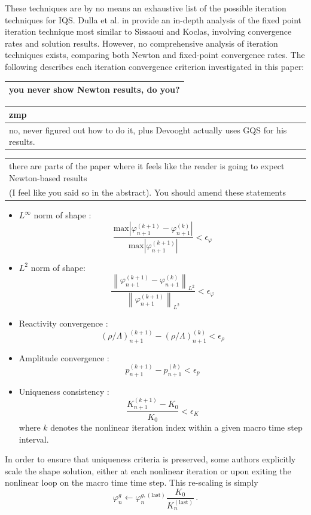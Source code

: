 \documentclass{elsarticle}
\def\answer#1#2{{\color{blue}
     \begin{tabular}{|l|}
       \hline{ #1}\\\hline{ #2}\\\hline
     \end{tabular}}}
\def\comm#1{{\color{magenta}
     \begin{tabular}{|l|}
       \hline #1 \\\hline
     \end{tabular}}}
\newcommand{\be}{\begin{equation}}
\newcommand{\ee}{\end{equation}}
\newcommand{\norm}[1]{\left\lVert#1\right\rVert_{L^2}}
\begin{document}
These techniques are by no means an exhaustive list of the possible iteration techniques for IQS. Dulla et al. in \cite{Dulla2008} provide an 
in-depth analysis of the fixed point iteration technique most similar to Sissaoui and Koclas, involving convergence rates and solution results.  
However, no comprehensive analysis of iteration techniques exists, comparing both Newton and fixed-point convergence rates.  The following describes 
each iteration convergence criterion investigated in this paper:
\comm{you never show Newton results, do you?}

\answer{zmp}{no, never figured out how to do it, plus Devooght actually uses GQS for his results.}

\comm{there are parts of the paper where it feels like the reader is going to expect Newton-based results\\
(I feel like you said so in the abstract). You should amend these statements}

\begin{itemize}
\item $L^\infty$ norm of shape \cite{Monier_diss}: 
\[
\frac{\text{max}\left|\varphi_{n+1}^{(k+1)} - \varphi_{n+1}^{(k)}\right|}{\text{max}\left|\varphi_{n+1}^{(k+1)}\right|} < \epsilon_{\varphi}
\]
\item $L^2$ norm of shape: 
\[
\frac{\norm{\varphi_{n+1}^{(k+1)} - \varphi_{n+1}^{(k)}}}{\norm{\varphi_{n+1}^{(k+1)}}} < \epsilon_{\varphi}
\]
\item Reactivity convergence \cite{Monier_diss}: 
\[
\left(\rho/\Lambda\right)^{(k+1)}_{n+1} - \left(\rho/\Lambda\right)^{(k)}_{n+1} < \epsilon_{\rho}
\]
\item Amplitude convergence \cite{Monier_diss}: 
\[
p_{n+1}^{(k+1)} - p_{n+1}^{(k)} < \epsilon_p
\]
\item Uniqueness consistency \cite{Monier_diss}: 
\[
\frac{K_{n+1}^{(k+1)} - K_0}{K_0} < \epsilon_K
\]
where $k$ denotes the nonlinear iteration index within a given macro time step interval.
\end{itemize}

In order to ensure that uniqueness criteria is preserved, some authors \cite{Monier_diss,Dulla2008} explicitly scale the shape solution, 
either at each nonlinear iteration or upon exiting the nonlinear loop on the macro time time step. This re-scaling is simply
\be 
\varphi^{g}_n \leftarrow \varphi^{g,(\text{last})}_n \frac{K_0}{K^{(\text{last})}_{n}} \,.
\label{eq:shape_scale}
\ee
\end{document}
